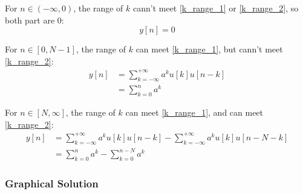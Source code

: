     For $n \in (-\infty,0)$, the range of $k$ cann't meet \eqref{k_range_1} or \eqref{k_range_2}, so both part are 0:
        \begin{equation}
            y[n] = 0
        \end{equation}
    
    For $n \in [0,N-1]$, the range of $k$ can meet \eqref{k_range_1}, but cann't meet \eqref{k_range_2}:
        \begin{equation}
            \begin{aligned}
            y[n] &= \sum_{k=-\infty}^{+\infty} a^ku[k]u[n-k]\\
                 &= \sum_{k=0}^{n}a^k
            \end{aligned}
        \end{equation}
    
    For $n \in [N,\infty]$, the range of $k$ can meet \eqref{k_range_1}, and can meet \eqref{k_range_2}:
        \begin{equation}
            \begin{aligned}
            y[n] &= \sum_{k=-\infty}^{+\infty} a^ku[k]u[n-k] -\sum_{k=-\infty}^{+\infty} a^ku[k]u[n-N-k] \\
                 &= \sum_{k=0}^{n}a^k - \sum_{k=0}^{n-N}a^k
            \end{aligned}
        \end{equation}
    
    \newpage
    \subsubsection{Graphical Solution}
    
